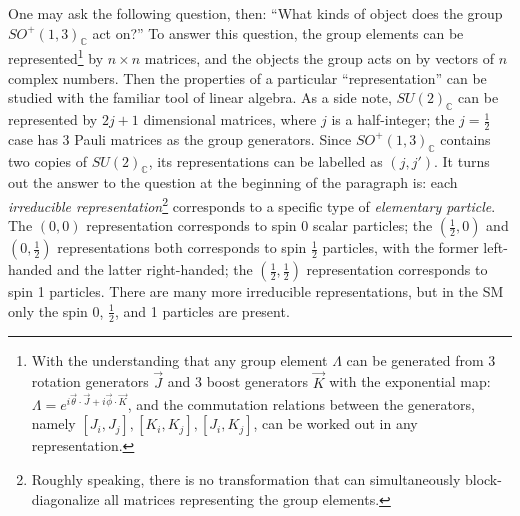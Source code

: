 One may ask the following question, then:
``What kinds of object does the group $SO^+(1,3)_\mathbb{C}$ act on?''
To answer this question, the group elements can be represented\footnote{
    With the understanding that any group element $\Lambda$ can be generated
    from 3 rotation generators $\vec{J}$ and 3 boost generators $\vec{K}$
    with the exponential map:
    $\Lambda = e^{i \vec{\theta} \cdot \vec{J} + i \vec{\phi} \cdot \vec{K}}$,
    and the commutation relations between the generators,
    namely $[J_i, J_j], [K_i, K_j], [J_i, K_j]$,
    can be worked out in any representation.
} by $n \times n$ matrices,
and the objects the group acts on by vectors of $n$ complex numbers.
Then the properties of a particular ``representation'' can be studied with
the familiar tool of linear algebra.
As a side note,
$SU(2)_\mathbb{C}$ can be represented by $2j + 1$ dimensional matrices,
where $j$ is a half-integer;
the $j = \frac{1}{2}$ case has 3 Pauli matrices as the group generators.
Since $SO^+(1,3)_\mathbb{C}$ contains two copies of $SU(2)_\mathbb{C}$,
its representations can be labelled as $(j, j')$.
It turns out the answer to the question at the beginning of the paragraph is:
each \emph{irreducible representation}\footnote{
    Roughly speaking, there is no transformation that can simultaneously
    block-diagonalize all matrices representing the group elements.
}
corresponds to a specific type of \emph{elementary particle}.
The $(0, 0)$ representation corresponds to spin 0 scalar particles;
the $(\frac{1}{2}, 0)$ and $(0, \frac{1}{2})$ representations both corresponds to
spin $\frac{1}{2}$ particles,
with the former left-handed and the latter right-handed;
the $(\frac{1}{2}, \frac{1}{2})$
representation corresponds to spin 1 particles.
There are many more irreducible representations,
but in the SM only the spin 0, $\frac{1}{2}$, and 1 particles are present.

